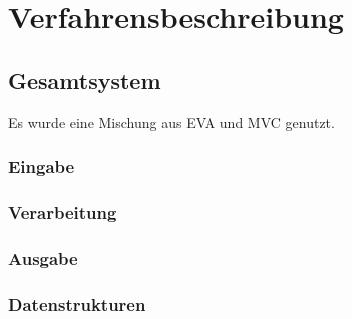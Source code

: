 \chapter{Verfahrensbeschreibung}\label{ch:verfahrensbeschreibung}


\section{Gesamtsystem}\label{sec:gesamtsystem}
Es wurde eine Mischung aus EVA und MVC genutzt. %

\subsection{Eingabe}\label{subsec:eingabe}
\subsection{Verarbeitung}\label{subsec:verarbeitung}
\subsection{Ausgabe}\label{subsec:ausgabe}
\subsection{Datenstrukturen}\label{subsec:datenstrukt}
